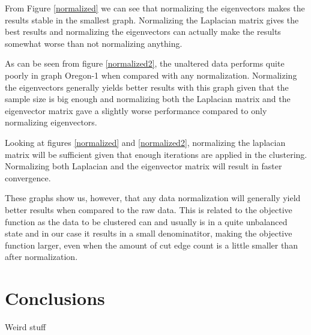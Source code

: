 \documentclass{article}
\begin{document}
From Figure \ref{normalized} we can see that normalizing the eigenvectors
makes the results stable in the smallest graph. Normalizing the Laplacian matrix gives the best results and
normalizing the eigenvectors can actually make the results somewhat worse than
not normalizing anything.

As can be seen from figure \ref{normalized2}, 
the unaltered data performs quite poorly in graph Oregon-1 when compared with any normalization. Normalizing 
the eigenvectors generally yields better results with this graph given that the sample
size is big enough and normalizing both the Laplacian matrix and the eigenvector matrix
gave a slightly worse performance compared to only normalizing eigenvectors. 

Looking at figures \ref{normalized} and \ref{normalized2}, normalizing the laplacian matrix will be sufficient
given that enough iterations are applied in the clustering. Normalizing both Laplacian and the eigenvector
matrix will result in faster convergence.

These graphs show us, however, that any data normalization will generally yield better results when 
compared to the raw data. This is related to the objective function as the data to be clustered
can and usually is in a quite unbalanced state and in our case it results in a small denominatitor, making
the objective function larger, even when the amount of cut edge count is a little smaller than after
normalization.

\clearpage
\section{Conclusions}

Weird stuff
\end{document}
